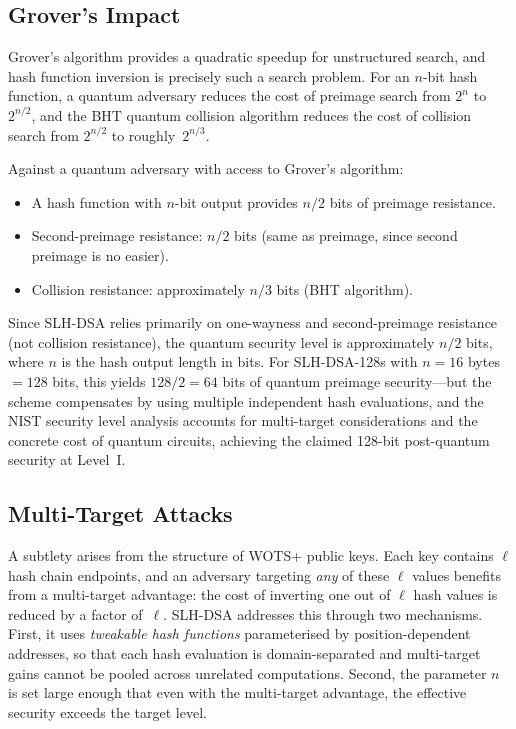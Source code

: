 \subsection{Grover's Impact}
\label{subsec:grover-impact}

Grover's algorithm provides a quadratic speedup for unstructured search, and hash function inversion is precisely such a search problem.  For an $n$-bit hash function, a quantum adversary reduces the cost of preimage search from $2^n$ to $2^{n/2}$, and the BHT quantum collision algorithm reduces the cost of collision search from $2^{n/2}$ to roughly~$2^{n/3}$.

\begin{theorem}
\label{thm:quantum-hash}
Against a quantum adversary with access to Grover's algorithm:
\begin{itemize}
\item A hash function with $n$-bit output provides $n/2$ bits of preimage resistance.
\item Second-preimage resistance: $n/2$ bits (same as preimage, since second preimage is no easier).
\item Collision resistance: approximately $n/3$ bits (BHT algorithm).
\end{itemize}
\end{theorem}

Since SLH-DSA relies primarily on one-wayness and second-preimage resistance (not collision resistance), the quantum security level is approximately $n/2$ bits, where $n$ is the hash output length in bits.  For SLH-DSA-128s with $n = 16$ bytes $= 128$ bits, this yields $128/2 = 64$ bits of quantum preimage security---but the scheme compensates by using multiple independent hash evaluations, and the NIST security level analysis accounts for multi-target considerations and the concrete cost of quantum circuits, achieving the claimed 128-bit post-quantum security at Level~I.

\subsection{Multi-Target Attacks}
\label{subsec:multi-target}

A subtlety arises from the structure of WOTS+ public keys.  Each key contains $\ell$ hash chain endpoints, and an adversary targeting \emph{any} of these $\ell$ values benefits from a multi-target advantage: the cost of inverting one out of $\ell$ hash values is reduced by a factor of~$\ell$.  SLH-DSA addresses this through two mechanisms.  First, it uses \emph{tweakable hash functions} parameterised by position-dependent addresses, so that each hash evaluation is domain-separated and multi-target gains cannot be pooled across unrelated computations.  Second, the parameter $n$ is set large enough that even with the multi-target advantage, the effective security exceeds the target level.

